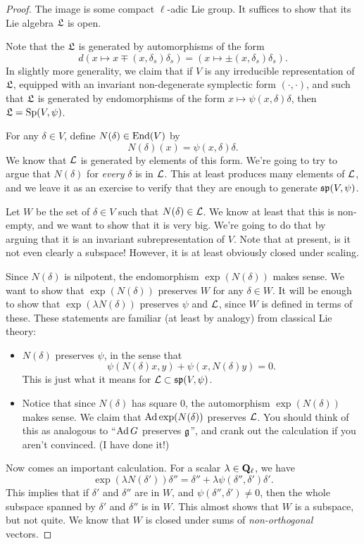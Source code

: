 \begin{proof}
The image is some compact $\ell$-adic Lie group. It suffices to show that its Lie algebra $\mathfrak{L}$ is open. 

Note that the $\mathfrak{L}$ is generated by automorphisms of the form
\[
d(x \mapsto x \mp (x, \delta_s) \delta_s) = (x \mapsto \pm (x, \delta_s) \delta_s).
\]
In slightly more generality, we claim that if $V$ is any irreducible representation of $\mathfrak{L}$, equipped with an invariant non-degenerate symplectic form $(\cdot, \cdot)$, and such that $\mathfrak{L}$ is generated by endomorphisms of the form $x \mapsto \psi(x, \delta) \delta$, then $\mathfrak{L} = \operatorname{Sp}(V, \psi)$. 


For any $\delta \in V$, define $N(\delta) \in \operatorname{End}(V)$ by 
\[
N(\delta)(x) = \psi(x, \delta) \delta. 
\]
We know that $\mathcal{L}$ is generated by elements of this form. We're going to try to argue that $N(\delta)$ for \emph{every} $\delta$ is in $\mathcal{L}$. This at least produces many elements of $\mathcal{L}$, and we leave it as an exercise to verify that they are enough to generate $\mathfrak{sp}(V, \psi)$. 


Let $W$ be the set of $\delta \in V$ such that $N(\delta) \in \mathcal{L}$. We know at least that this is non-empty, and we want to show that it is very big. We're going to do that by arguing that it is an invariant subrepresentation of $V$. Note that at present, is it not even clearly a subspace! However, it is at least obviously closed under scaling. 

Since $N(\delta)$ is nilpotent, the endomorphism $\exp(N(\delta))$ makes sense. We want to show that $\exp( N(\delta))$ preserves $W$ for any $\delta  \in W$. It will be enough to show that $\exp(\lambda N(\delta))$ preserves $\psi$ and $\mathcal{L}$, since $W$ is defined in terms of these. These statements are familiar (at least by analogy) from classical Lie theory: 
\begin{itemize}
\item $N(\delta)$ preserves $\psi$, in the sense that 
\[
\psi(N(\delta) x, y) + \psi(x, N(\delta) y) = 0.
\]
This is just what it means for $\mathcal{L} \subset \mathfrak{sp}(V, \psi)$. 
\item Notice that since $N(\delta)$ has square $0$, the automorphism $\exp(N (\delta))$ makes sense. We claim that $\operatorname{Ad} \exp(N (\delta))$ preserves $\mathcal{L}$. You should think of this as analogous to ``$\operatorname{Ad} G$ preserves $\mathfrak{g}$'', and crank out the calculation if you aren't convinced. (I have done it!) 
\end{itemize}
Now comes an important calculation. For a scalar $\lambda \in \mathbf{Q}_{\ell}$, we have 
\[
\exp(\lambda N(\delta')) \delta'' = \delta'' + \lambda \psi(\delta'', \delta')\delta'. 
\]
This implies that if $\delta'$ and $\delta''$ are in $W$, and $\psi(\delta'', \delta') \neq 0$, then the whole subspace spanned by $\delta'$ and $\delta''$ is in $W$. This almost shows that $W$ is a subspace, but not quite. We know that $W$ is closed under sums of \emph{non-orthogonal} vectors. 


\end{proof}
